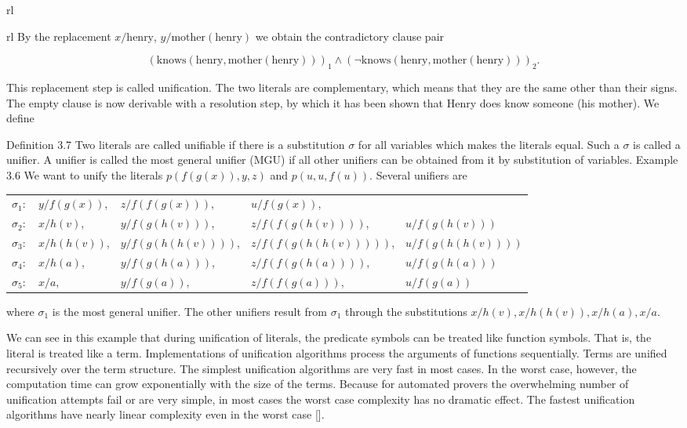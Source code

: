 \documentclass[10pt]{book}
\begin{document}
\begin{center}
\begin{tabular}{rl}
\begin{tabular}{rl}
By the replacement $x/\text{henry}$, $y/\text{mother}(\text{henry})$ we obtain the contradictory clause pair

$$
(\text{knows}(\text{henry}, \text{mother}(\text{henry})))_{1} \wedge (\neg \text{knows}(\text{henry}, \text{mother}(\text{henry})))_{2}.
$$

This replacement step is called unification. The two literals are complementary, which means that they are the same other than their signs. The empty clause is now derivable with a resolution step, by which it has been shown that Henry does know someone (his mother). We define

Definition 3.7 Two literals are called unifiable if there is a substitution $\sigma$ for all variables which makes the literals equal. Such a $\sigma$ is called a unifier. A unifier is called the most general unifier (MGU) if all other unifiers can be obtained from it by substitution of variables.
Example 3.6 We want to unify the literals $p(f(g(x)), y, z)$ and $p(u, u, f(u))$. Several unifiers are

\begin{center}
\begin{tabular}{lllll}
$\sigma_{1}:$ & $y / f(g(x))$, & $z / f(f(g(x)))$, & $u / f(g(x))$, &  \\
$\sigma_{2}:$ & $x / h(v)$, & $y / f(g(h(v)))$, & $z / f(f(g(h(v))))$, & $u / f(g(h(v)))$ \\
$\sigma_{3}:$ & $x / h(h(v))$, & $y / f(g(h(h(v))))$, & $z / f(f(g(h(h(v)))))$, & $u / f(g(h(h(v))))$ \\
$\sigma_{4}:$ & $x / h(a)$, & $y / f(g(h(a)))$, & $z / f(f(g(h(a))))$, & $u / f(g(h(a)))$ \\
$\sigma_{5}:$ & $x / a$, & $y / f(g(a))$, & $z / f(f(g(a)))$, & $u / f(g(a))$ \\
\end{tabular}
\end{center}

where $\sigma_{1}$ is the most general unifier. The other unifiers result from $\sigma_{1}$ through the substitutions $x / h(v), x / h(h(v)), x / h(a), x / a$.

We can see in this example that during unification of literals, the predicate symbols can be treated like function symbols. That is, the literal is treated like a term. Implementations of unification algorithms process the arguments of functions sequentially. Terms are unified recursively over the term structure. The simplest unification algorithms are very fast in most cases. In the worst case, however, the computation time can grow exponentially with the size of the terms. Because for automated provers the overwhelming number of unification attempts fail or are very simple, in most cases the worst case complexity has no dramatic effect. The fastest unification algorithms have nearly linear complexity even in the worst case [\cite{bibel1982automated}].


\end{tabular}
\end{tabular}
\end{center}
\end{document}
